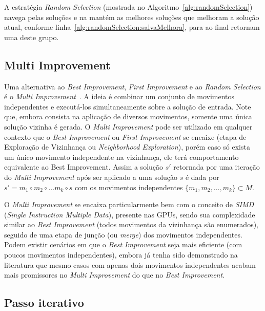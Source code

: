 A estratégia \textit{Random Selection} (mostrada no Algoritmo~\ref{alg:randomSelection}) navega pelas soluções e na mantém as melhores soluções que melhoram a solução atual, conforme linha~\ref{alg:randomSelection:salvaMelhora}, para ao final retornam uma deste grupo.

\subsection{Multi Improvement}

Uma alternativa ao \emph{Best Improvement}, \emph{First Improvement} e ao \emph{Random Selection} é o \emph{Multi Improvement}~\cite{rios2015}.
A ideia é combinar um conjunto de movimentos independentes e executá-los simultaneamente sobre a solução de entrada.
Note que, embora consista na aplicação de diversos movimentos, somente uma única solução vizinha é gerada.
O \emph{Multi Improvement} pode ser utilizado em qualquer contexto que o \emph{Best Improvement} ou \emph{First Improvement} se encaixe (etapa de Exploração de Vizinhança ou {\it Neighborhood Exploration}), porém caso só exista um único movimento independente na vizinhança, ele terá comportamento equivalente ao Best Improvement.
Assim a solução $s'$ retornada por uma iteração do \emph{Multi Improvement} após ser aplicado a uma solução $s$ é dada por $s' = m_1 \circ m_2 \circ \dots m_k \circ s$ com os movimentos independentes $\{ m_1, m_2, \dots, m_k \} \subset M$.

O \emph{Multi Improvement} se encaixa particularmente bem com o conceito de \emph{SIMD} (\emph{Single Instruction Multiple Data}), presente nas GPUs, sendo sua complexidade similar ao \emph{Best Improvement} (todos movimentos da vizinhança são enumerados), seguido de uma etapa de junção (ou {\it merge}) dos movimentos independentes.
Podem existir cenários em que o \emph{Best Improvement} seja mais eficiente (com poucos movimentos independentes), embora já tenha sido demonstrado na literatura que mesmo casos com apenas dois movimentos independentes acabam mais promissores no \emph{Multi Improvement} do que no \emph{Best Improvement}. %

\subsection{Passo iterativo} \label{subsec:passoIterativo}

